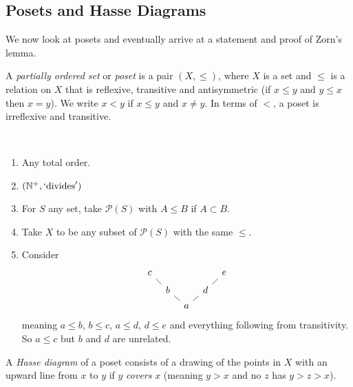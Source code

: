 \documentclass[a3paper, 10pt]{article}
\newcommand{\enumpre}{}
\renewcommand{\vocab}[1]{\emph{#1}}
\begin{document}
\begin{multicols*}{5}
\subsection{Posets and Hasse Diagrams}

We now look at posets and eventually arrive at a statement and proof of Zorn's lemma.

\begin{definition}[Poset]
  A \vocab{partially ordered set} or \vocab{poset} is a pair $(X, \leq)$, where $X$ is a set and $\leq$ is a relation on $X$ that is reflexive, transitive and antisymmetric (if $x \leq y$ and $y \leq x$ then $x = y$). We write $x < y$ if $x \leq y$ and $x \neq y$. In terms of $<$, a poset is irreflexive and transitive.
\end{definition}

\begin{example}~
  \enumpre
  \begin{enumerate}
    \item Any total order.
    \item $(\mathbb{N}^+, `\text{divides}')$
    \item For $S$ any set, take $\mathcal{P}(S)$ with $A \leq B$ if $A \subset B$.
    \item Take $X$ to be any subset of $\mathcal{P}(S)$ with the same $\leq$.
    \item Consider
\[\begin{tikzcd}[sep=tiny]
	c &&&& e \\
	& b && d \\
	&& a
	\arrow[no head, from=3-3, to=2-2]
	\arrow[no head, from=2-2, to=1-1]
	\arrow[no head, from=3-3, to=2-4]
	\arrow[no head, from=2-4, to=1-5]
\end{tikzcd}\]
meaning $a \leq b$, $b \leq c$, $a \leq d$, $d \leq e$ and everything following from transitivity. So $a \leq c$ but $b$ and $d$ are unrelated.
  \end{enumerate}
\end{example}

\begin{definition}
  A \vocab{Hasse diagram} of a poset consists of a drawing of the points in $X$ with an upward line from $x$ to $y$ if $y$ \vocab{covers} $x$ (meaning $y > x$ and no $z$ has $y > z > x$).
\end{definition}


\end{multicols*}
\end{document}
